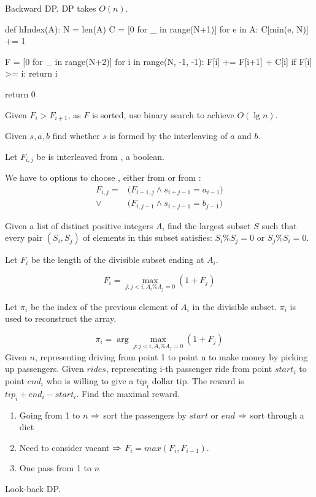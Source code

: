 Backward DP. DP takes $O(n)$. 
\begin{python}
def hIndex(A):
    N = len(A)
    C = [0 for _ in range(N+1)]
    for e in A:
        C[min(e, N)] += 1

    F = [0 for _ in range(N+2)]
    for i in range(N, -1, -1):
        F[i] += F[i+1] + C[i]
        if F[i] >= i:
            return i

    return 0
\end{python}

Given $F_i > F_{i+1}$, as $F$ is sorted, use binary search to achieve $O(\lg n)$.

 Given $s, a, b$ find whether $s$ is formed by the interleaving
of $a$ and $b$.

Let $F_{i,j}$ be  is interleaved from , a boolean.

We have to options to choose , either from  or from :
\begin{align*}
F_{i,j} = &\Big(F_{i-1, j} \wedge s_{i+j-1} = a_{i-1}\Big) \\
 \vee &\Big(F_{i,j-1} \wedge s_{i+j-1} = b_{j-1}\Big)
\end{align*}

 Given a list of distinct positive integers $A$, find the largest subset $S$ such that every pair $(S_i, S_j)$ of elements in this
subset satisfies: $S_i \% S_j = 0 \text{ or } S_j \% S_i = 0$.

Let $F_i$ be the length of the divisible subset ending at $A_i$. 

$$
F_i = \max_{j: j< i, A_i\%A_j=0}(1+F_j)
$$

Let $\pi_i$ be the index of the previous element of $A_i$ in the divisible subset. $\pi_i$ is used to reconstruct the array.

$$
\pi_i = \arg\max_{j: j< i, A_i\%A_j=0}(1+F_j)
$$
 Given $n$, representing driving from point 1 to point n to make money by picking up passengers. Given $rides$, representing i-th passenger ride from point $start_i$ to point $end_i$ who is willing to give a $tip_i$ dollar tip. The reward is $tip_i + end_i - start_i$. Find the maximal reward. 

\begin{enumerate}
\item Going from 1 to $n$ $\Rightarrow$ sort the passengers by $start$ or $end$ $\Rightarrow$ sort through a dict
\item Need to consider vacant $\Rightarrow$ $F_i = max(F_i, F_{i-1})$.
\item One pass from 1 to $n$
\end{enumerate}
Look-back DP.

